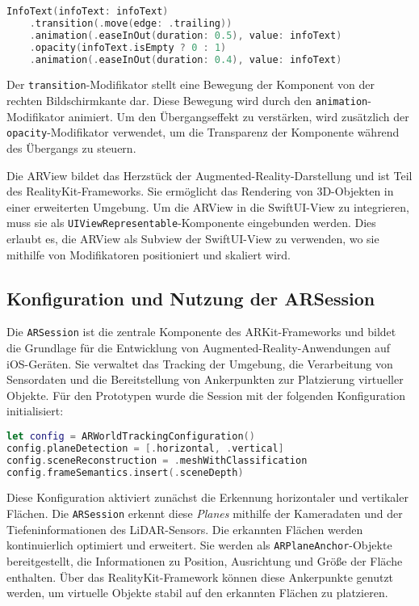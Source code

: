 \begin{lstlisting}[language=Swift]
InfoText(infoText: infoText)
    .transition(.move(edge: .trailing))
    .animation(.easeInOut(duration: 0.5), value: infoText)
    .opacity(infoText.isEmpty ? 0 : 1)
    .animation(.easeInOut(duration: 0.4), value: infoText)
\end{lstlisting}

Der \texttt{transition}-Modifikator stellt eine Bewegung der Komponent von der rechten Bildschirmkante dar. Diese Bewegung wird durch den \texttt{animation}-Modifikator animiert. Um den Übergangseffekt zu verstärken, wird zusätzlich der \texttt{opacity}-Modifikator verwendet, um die Transparenz der Komponente während des Übergangs zu steuern.

Die ARView bildet das Herzstück der Augmented-Reality-Darstellung und ist Teil des RealityKit-Frameworks. Sie ermöglicht das Rendering von 3D-Objekten in einer erweiterten Umgebung. Um die ARView in die SwiftUI-View zu integrieren, muss sie als \texttt{UIViewRepresentable}-Komponente eingebunden werden. Dies erlaubt es, die ARView als Subview der SwiftUI-View zu verwenden, wo sie mithilfe von Modifikatoren positioniert und skaliert wird.

\subsection{Konfiguration und Nutzung der ARSession}

Die \texttt{ARSession} ist die zentrale Komponente des ARKit-Frameworks und bildet die Grundlage für die Entwicklung von Augmented-Reality-Anwendungen auf iOS-Geräten. Sie verwaltet das Tracking der Umgebung, die Verarbeitung von Sensordaten und die Bereitstellung von Ankerpunkten zur Platzierung virtueller Objekte. Für den Prototypen wurde die Session mit der folgenden Konfiguration initialisiert:

\begin{lstlisting}[language=Swift]
let config = ARWorldTrackingConfiguration()
config.planeDetection = [.horizontal, .vertical]
config.sceneReconstruction = .meshWithClassification
config.frameSemantics.insert(.sceneDepth)
\end{lstlisting}

Diese Konfiguration aktiviert zunächst die Erkennung horizontaler und vertikaler Flächen. Die \texttt{ARSession} erkennt diese \textit{Planes} mithilfe der Kameradaten und der Tiefeninformationen des LiDAR-Sensors. Die erkannten Flächen werden kontinuierlich optimiert und erweitert. Sie werden als \texttt{ARPlaneAnchor}-Objekte bereitgestellt, die Informationen zu Position, Ausrichtung und Größe der Fläche enthalten. Über das RealityKit-Framework können diese Ankerpunkte genutzt werden, um virtuelle Objekte stabil auf den erkannten Flächen zu platzieren.

